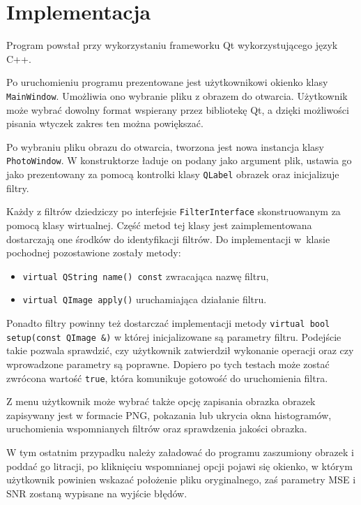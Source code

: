 \documentclass{classrep}
\begin{document}
\clearpage

\section{Implementacja}
Program powstał przy wykorzystaniu frameworku Qt wykorzystującego język C++.

Po uruchomieniu programu prezentowane jest użytkownikowi okienko klasy \texttt{MainWindow}. Umożliwia ono wybranie pliku z obrazem do otwarcia. Użytkownik może wybrać dowolny format wspierany przez bibliotekę Qt, a dzięki możliwości pisania wtyczek \ppauza zakres ten można powiększać.

Po wybraniu pliku obrazu do otwarcia, tworzona jest nowa instancja klasy \texttt{PhotoWindow}. W konstruktorze ładuje on podany jako argument plik, ustawia go jako prezentowany za pomocą kontrolki klasy \texttt{QLabel} obrazek oraz inicjalizuje filtry.

Każdy z filtrów dziedziczy po interfejsie \texttt{FilterInterface} skonstruowanym za pomocą klasy wirtualnej. Część metod tej klasy jest zaimplementowana \ppauza dostarczają one środków do identyfikacji filtrów. Do implementacji w~klasie pochodnej pozostawione zostały metody:
\begin{itemize}
 \item \texttt{virtual QString name() const} \ppauza zwracająca nazwę filtru,
 \item \texttt{virtual QImage apply()} \ppauza uruchamiająca działanie filtru.
\end{itemize}

Ponadto filtry powinny też dostarczać implementacji metody \texttt{virtual bool setup(const QImage \&)} w której inicjalizowane są parametry filtru. Podejście takie pozwala sprawdzić, czy użytkownik zatwierdził wykonanie operacji oraz czy wprowadzone parametry są poprawne. Dopiero po tych testach może zostać zwrócona wartość \texttt{true}, która komunikuje gotowość do uruchomienia filtra.

Z menu użytkownik może wybrać także opcję zapisania obrazka \ppauza obrazek zapisywany jest w formacie PNG, pokazania lub ukrycia okna histogramów, uruchomienia wspomnianych filtrów oraz sprawdzenia jakości obrazka.

W tym ostatnim przypadku należy załadować do programu zaszumiony obrazek i poddać go litracji, po kliknięciu wspomnianej opcji pojawi się okienko, w którym użytkownik powinien wskazać położenie pliku oryginalnego, zaś parametry MSE i SNR zostaną wypisane na wyjście błędów.
\end{document}
